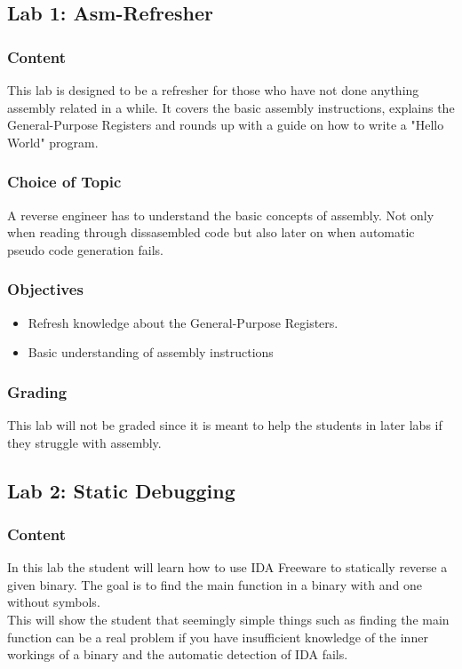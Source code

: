 
\subsection{Lab 1: Asm-Refresher}
\subsubsection*{Content}
This lab is designed to be a refresher for those who have not done anything assembly related in a while. It covers the basic assembly instructions, explains the General-Purpose Registers and rounds up with a guide on how to write a "Hello World" program.  
\subsubsection*{Choice of Topic}
A reverse engineer has to understand the basic concepts of assembly. Not only when reading through dissasembled code but also later on when automatic pseudo code generation fails.
\subsubsection*{Objectives}
\begin{itemize}
    \item Refresh knowledge about the General-Purpose Registers.
    \item Basic understanding of assembly instructions
\end{itemize}
\subsubsection*{Grading}
This lab will not be graded since it is meant to help the students in later labs if they struggle with assembly.

\subsection{Lab 2: Static Debugging}
\subsubsection*{Content}
In this lab the student will learn how to use IDA Freeware to statically reverse a given binary. The goal is to find the main function in a binary with and one without symbols. \\
This will show the student that seemingly simple things such as finding the main function can be a real problem if you have insufficient knowledge of the inner workings of a binary and the automatic detection of IDA fails.

